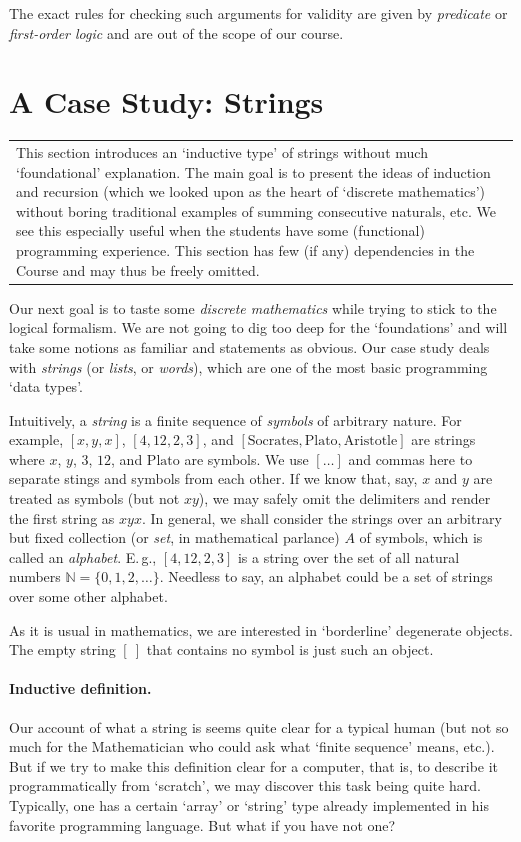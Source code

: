 \documentclass[12pt,notitlepage]{article}
\theoremstyle{plain}
\theoremstyle{definition}
\theoremstyle{plain}
\newcommand{\N}{\mathbb{N}}
\newcommand{\1}{\mathbf{1}}
\newcommand{\0}{\mathbf{0}}
\newcommand{\mcomm}[1]{
\medskip\noindent\begin{tabular}{| l}
\parbox{0.99\textwidth}{{\small
#1 }}\end{tabular}
\smallskip}
\begin{document}
The exact rules for checking such arguments for validity are given by \emph{predicate} or \emph{first-order logic} and are out of the scope of our course.

\newpage
\section{A Case Study: Strings}\label{sect:strings}

\mcomm{This section introduces an `inductive type' of strings without much `foundational' explanation. The main goal is to present the ideas of induction and recursion (which we looked upon as the heart of `discrete mathematics') without boring traditional examples of summing consecutive naturals, etc. We see this especially useful when the students have some (functional) programming experience. This section has few (if any) dependencies in the Course and may thus be freely omitted.}

Our next goal is to taste some \emph{discrete mathematics} while trying to stick to the logical formalism. We are not going to dig too deep for the `foundations' and will take some notions as familiar and statements as obvious. Our case study deals with \emph{strings} (or \emph{lists}, or \emph{words}), which are one of the most basic programming `data types'.

Intuitively, a \emph{string} is a finite sequence of \emph{symbols} of arbitrary nature. For example, $[x, y, x]$, $[4, 12, 2, 3]$, and $[\mbox{Socrates}, \mbox{Plato}, \mbox{Aristotle}]$ are strings where $x$, $y$, $3$, $12$, and $\mbox{Plato}$ are symbols. We use $[\ldots]$ and commas here to separate stings and symbols from each other. If we know that, say, $x$ and $y$ are treated as symbols (but not $xy$), we may safely omit the delimiters and render the first string as $xyx$. In general, we shall consider the strings over an arbitrary but fixed collection (or \emph{set}, in mathematical parlance) $A$ of symbols, which is called an \emph{alphabet}. E.\,g., $[4, 12, 2, 3]$ is a string over the set of all natural numbers $\N = \{0,1,2,\ldots\}$. Needless to say, an alphabet could be a set of strings over some other alphabet.

As it is usual in mathematics, we are interested in `borderline' degenerate objects. The empty string $[\ ]$ that contains no symbol is just such an object.

\paragraph{Inductive definition.} Our account of what a string is seems quite clear for a typical human (but not so much for the Mathematician who could ask what `finite sequence' means, etc.). But if we try to make this definition clear for a computer, that is, to describe it programmatically from `scratch', we may discover this task being quite hard. Typically, one has a certain `array' or `string' type already implemented in his favorite programming language. But what if you have not one?
\end{document}
